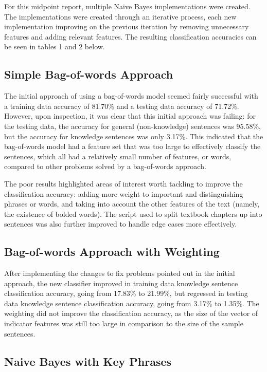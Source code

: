 \documentclass{article} %
\begin{document}
For this midpoint report, multiple Naive Bayes implementations were created. The implementations were created through an iterative process, each new implementation improving on the previous iteration by removing unnecessary features and adding relevant features. The resulting classification accuracies can be seen in tables 1 and 2 below.

\subsection{Simple Bag-of-words Approach}

The initial approach of using a bag-of-words model seemed fairly successful with a training data accuracy of 81.70\% and a testing data accuracy of 71.72\%. However, upon inspection, it was clear that this initial approach was failing: for the testing data, the accuracy for general (non-knowledge) sentences was 95.58\%, but the accuracy for knowledge sentences was only 3.17\%. This indicated that the bag-of-words model had a feature set that was too large to effectively classify the sentences, which all had a relatively small number of features, or words, compared to other problems solved by a bag-of-words approach.

The poor results highlighted areas of interest worth tackling to improve the classification accuracy: adding more weight to important and distinguishing phrases or words, and taking into account the other features of the text (namely, the existence of bolded words). The script used to split textbook chapters up into sentences was also further improved to handle edge cases more effectively.

\subsection{Bag-of-words Approach with Weighting}

After implementing the changes to fix problems pointed out in the initial approach, the new classifier improved in training data knowledge sentence classification accuracy, going from 17.83\% to 21.99\%, but regressed in testing data knowledge sentence classification accuracy, going from 3.17\% to 1.35\%. The weighting did not improve the classification accuracy, as the size of the vector of indicator features was still too large in comparison to the size of the sample sentences.

\subsection{Naive Bayes with Key Phrases}
\end{document}
